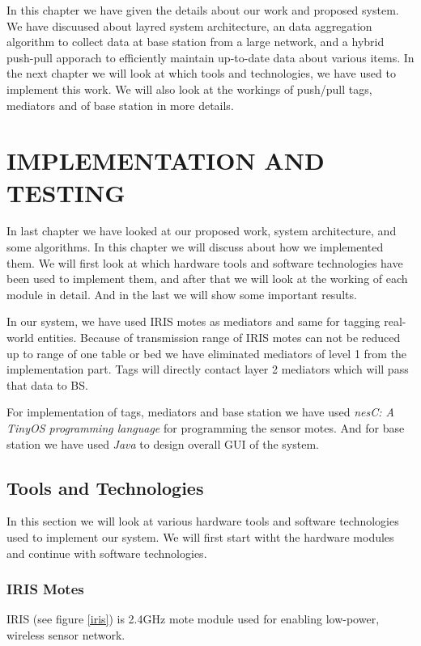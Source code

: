 \documentclass [a4paper,12pt]{book}
\begin{document}
In this chapter we have given the details about our work and proposed system. We have discuused about layred system architecture, an data aggregation algorithm to collect data at base station from a large network, and a hybrid push-pull apporach to efficiently maintain up-to-date data about various items. In the next chapter we will look at which tools and technologies, we have used to implement this work. We will also look at the workings of push/pull tags, mediators and of base station in more details.

\newpage
\chapter{IMPLEMENTATION AND TESTING}
\vspace{0.2cm}
In last chapter we have looked at our proposed work, system architecture, and some algorithms. In this chapter we will discuss about how we implemented them. We will first look at which hardware tools and software technologies have been used to implement them, and after that we will look at the working of each module in detail. And in the last we will show some important results.

In our system, we have used IRIS motes as mediators and same for tagging real-world entities. Because of transmission range of IRIS motes can not be reduced up to range of one table or bed we have eliminated mediators of level 1 from the implementation part. Tags will directly contact layer 2 mediators which will pass that data to BS.

For implementation of tags, mediators and base station we have used \emph{nesC: A TinyOS programming language} for programming the sensor motes. And for base station we have used \emph{Java} to design overall GUI of the system.

\section{Tools and Technologies}
In this section we will look at various hardware tools and software technologies used to implement our system. We will first start witht the hardware modules and continue with software technologies.
\subsection{IRIS Motes}
IRIS (see figure \ref{iris}) is 2.4GHz mote module used for enabling low-power, wireless sensor network.
\end{document}
